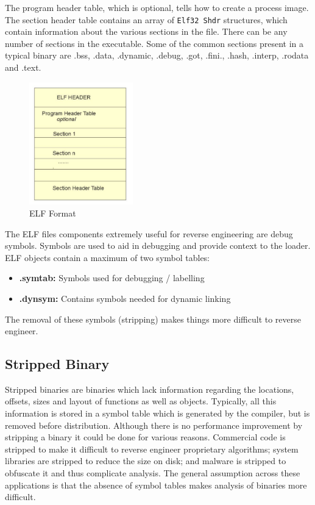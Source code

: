 \documentclass{article}
\begin{document}
The program header table, which is optional, tells how to create a process image. The section header table 
contains an array of \texttt{Elf32 Shdr} structures, which contain information about the various sections in the file. 
There can be any number of sections in the executable. Some of the common sections present in a typical binary 
are .bss, .data, .dynamic, .debug, .got, .fini., .hash, .interp, .rodata and .text. \citep{stripped}
\begin{figure}[H]
\centering
\includegraphics[width=0.4\textwidth]{img/ELF_Format.pdf}
\caption{ELF Format}
\label{fig:elf}
\end{figure}
The ELF files components extremely useful for reverse engineering are debug symbols. Symbols are used
to aid in debugging and provide context to the loader. ELF objects contain a maximum of two symbol tables:
\begin{itemize}
\item{\textbf{.symtab:}} Symbols used for debugging / labelling
\item{\textbf{.dynsym:}} Contains symbols needed for dynamic linking
\end{itemize}
The removal of these symbols (stripping) makes things more difficult to reverse engineer.

\subsection{Stripped Binary}

Stripped binaries are binaries which lack information regarding the locations, offsets, sizes and layout of functions 
as well as objects. Typically, all this information is stored in a symbol table which is generated by the compiler, 
but is removed before distribution. Although there is no performance improvement by stripping a binary it 
could be done for various reasons. Commercial code is stripped to make it difficult to reverse engineer proprietary 
algorithms; system libraries are stripped to reduce the size on disk; and malware is stripped to obfuscate it and 
thus complicate analysis. The general assumption across these applications is that the absence of symbol tables 
makes analysis of binaries more difficult. \citep{stripped}
\end{document}
